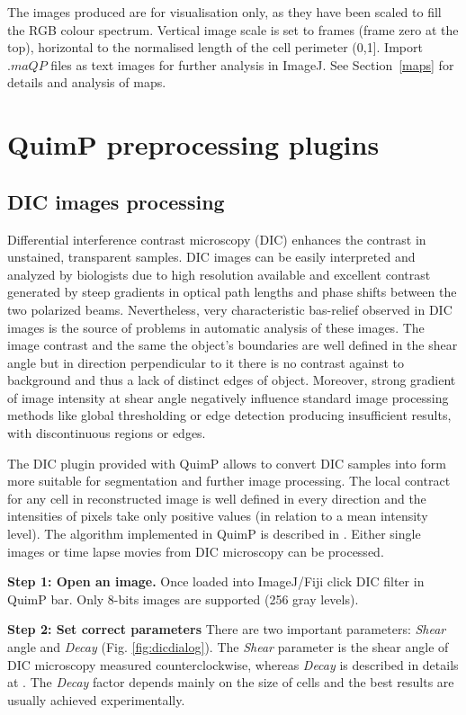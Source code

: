 \documentclass[a4paper,12pt]{article}
\begin{document}
The images produced are for visualisation only, as they have been scaled to fill the RGB colour spectrum.
Vertical image scale is set to frames (frame zero at the top),
horizontal to the normalised length of the cell perimeter (0,1].
Import $.maQP$ files as text images for further analysis in ImageJ. See Section~\ref{maps} for details
and analysis of maps.

\section{QuimP preprocessing plugins}
\label{sec:QuimP_preplugins}
\subsection{DIC images processing}
\label{sec:DIC}

Differential interference contrast microscopy (DIC) enhances the contrast in unstained, transparent samples. DIC images can be easily interpreted and analyzed by biologists due to high resolution available and excellent contrast generated by steep gradients in optical path lengths and phase shifts between the two polarized beams. Nevertheless, very characteristic bas-relief observed in DIC images is the source of problems in automatic analysis of these images. The image contrast and the same the object’s boundaries are well defined in the shear angle but in direction perpendicular to it there is no contrast against to background and thus a lack of distinct edges of object. Moreover, strong gradient of image intensity at shear angle negatively influence standard image processing methods like global thresholding or edge detection producing insufficient results, with discontinuous regions or edges.

The DIC plugin provided with QuimP allows to convert DIC samples into form more suitable for segmentation and further image processing. The local contract for any cell in reconstructed image is well defined in every direction and the intensities of pixels take only positive values (in relation to a mean intensity level). The algorithm implemented in QuimP is described in \cite{Kam1998}. Either single images or time lapse movies from DIC microscopy can be processed. 

\textbf{Step 1: Open an image.}
Once loaded into ImageJ/Fiji click DIC filter in QuimP bar. Only 8-bits images are supported (256 gray levels).

\textbf{Step 2: Set correct parameters}
There are two important parameters: \textit{Shear} angle and \textit{Decay} (Fig. \ref{fig:dicdialog}). The \textit{Shear} parameter is the shear angle of DIC microscopy measured counterclockwise, whereas \textit{Decay} is described in details at \cite{Kam1998}. The \textit{Decay} factor depends mainly on the size of cells and the best results are usually achieved experimentally.
\end{document}
